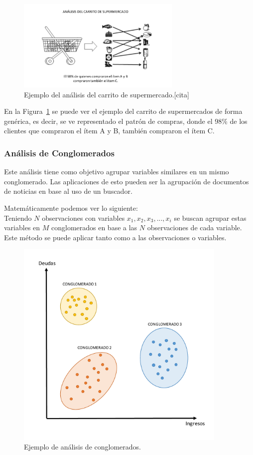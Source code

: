\begin{figure}[H]
  \centering
    \includegraphics[width=0.7\textwidth]{Figuras/Carrito}
      \caption{Ejemplo del análisis del carrito de supermercado.[cita]}
    \label{fig:carrito}
\end{figure}

En la Figura~\ref{fig:carrito} se puede ver el ejemplo del carrito de supermercados de forma genérica, es decir, se ve representado el patrón de compras, donde el 98\% de los clientes que compraron el ítem A y B, también compraron el ítem C. 

\subsubsection{Análisis de Conglomerados}
Este análisis tiene como objetivo agrupar variables similares en un mismo conglomerado. Las aplicaciones de esto pueden ser la agrupación de documentos de noticias en base al uso de un buscador.

Matemáticamente podemos ver lo siguiente:\\
Teniendo $N$ observaciones con variables $x_1, x_2, x_3, ... , x_i$ se buscan agrupar estas variables en $M$ conglomerados en base a las $N$ observaciones de cada variable. Este método se puede aplicar tanto como a las observaciones o variables.

\begin{figure}[H]
  \centering
    \includegraphics[width=0.9\textwidth]{Figuras/Conglomerados}
      \caption{Ejemplo de análisis de conglomerados.}
    \label{fig:conglomerado}
\end{figure}

